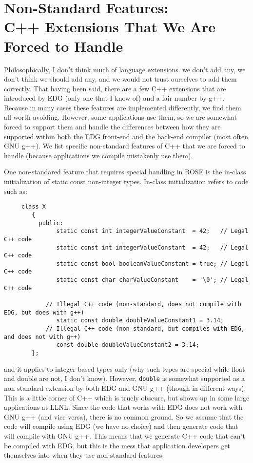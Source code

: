 \section{Non-Standard Features: \\ C++ Extensions That We Are Forced to Handle}

    Philosophically, I don't think much of language extensions. we don't add any, 
we don't think we should add any, and we would not trust ourselves to add them correctly.
That having been said, there are a few C++ extensions that are introduced by
EDG (only one that I know of) and a fair number by g++.  Because in many cases these features 
are implemented differently, we find them all worth avoiding.  However,
some applications use them, so we are somewhat forced to support them and handle the 
differences between how they are supported within both the EDG front-end and the
back-end compiler (most often GNU g++).  We list specific non-standard features of
C++ that we are forced to handle (because applications we compile mistakenly use them).

One non-standared feature that requires special handling in ROSE is the
in-class initialization of static const non-integer types. In-class initialization 
refers to code such as:
{\indent
{\mySmallFontSize
\begin{verbatim}
     class X
        {
          public:
               static const int integerValueConstant  = 42;   // Legal C++ code
               static const int integerValueConstant  = 42;   // Legal C++ code
               static const bool booleanValueConstant = true; // Legal C++ code
               static const char charValueConstant    = '\0'; // Legal C++ code

            // Illegal C++ code (non-standard, does not compile with EDG, but does with g++)
               static const double doubleValueConstant1 = 3.14; 
            // Illegal C++ code (non-standard, but compiles with EDG, and does not with g++)
               const double doubleValueConstant2 = 3.14; 
        };
\end{verbatim}
}}
           and it applies to integer-based types only (why such types are special while float
           and double are not, I don't know). However, {\tt double} is somewhat supported 
           as a non-standard extension by both EDG and GNU g++ (though in different ways).
           This is a little corner of C++ which is truely obscure, but shows up in some
           large applications at LLNL.  Since the code that works with EDG does not work
           with GNU g++ (and vice versa),
           there is no common ground.  So we assume that the code will compile using EDG
           (we have no choice) and then generate code that will compile with GNU g++.
           This means that we generate C++ code that can't be compiled with EDG, but this 
           is the mess that application developers get themselves into when they use
           non-standard features.

